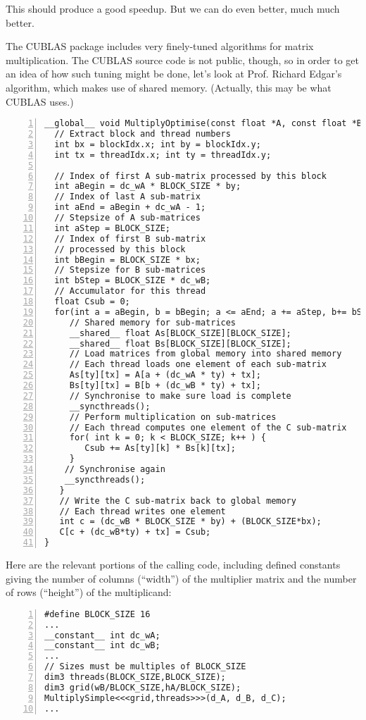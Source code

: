 This should produce a good speedup.  But we can do even better, much
much better.  

The CUBLAS package includes very finely-tuned algorithms for matrix
multiplication.  The CUBLAS source code is not public, though, so in
order to get an idea of how such tuning might be done, let's look at
Prof.  Richard Edgar's algorithm, which makes use of shared memory.
(Actually, this may be what CUBLAS uses.)

\begin{lstlisting}[numbers=left]
__global__ void MultiplyOptimise(const float *A, const float *B, float *C) {
  // Extract block and thread numbers
  int bx = blockIdx.x; int by = blockIdx.y;
  int tx = threadIdx.x; int ty = threadIdx.y;
  
  // Index of first A sub-matrix processed by this block
  int aBegin = dc_wA * BLOCK_SIZE * by;
  // Index of last A sub-matrix
  int aEnd = aBegin + dc_wA - 1;
  // Stepsize of A sub-matrices
  int aStep = BLOCK_SIZE;
  // Index of first B sub-matrix
  // processed by this block
  int bBegin = BLOCK_SIZE * bx;
  // Stepsize for B sub-matrices
  int bStep = BLOCK_SIZE * dc_wB;
  // Accumulator for this thread
  float Csub = 0;
  for(int a = aBegin, b = bBegin; a <= aEnd; a += aStep, b+= bStep) {
     // Shared memory for sub-matrices
     __shared__ float As[BLOCK_SIZE][BLOCK_SIZE];
     __shared__ float Bs[BLOCK_SIZE][BLOCK_SIZE];
     // Load matrices from global memory into shared memory
     // Each thread loads one element of each sub-matrix
     As[ty][tx] = A[a + (dc_wA * ty) + tx];
     Bs[ty][tx] = B[b + (dc_wB * ty) + tx];
     // Synchronise to make sure load is complete
     __syncthreads();
     // Perform multiplication on sub-matrices
     // Each thread computes one element of the C sub-matrix
     for( int k = 0; k < BLOCK_SIZE; k++ ) {
        Csub += As[ty][k] * Bs[k][tx];
     }
    // Synchronise again
    __syncthreads();
   }
   // Write the C sub-matrix back to global memory
   // Each thread writes one element
   int c = (dc_wB * BLOCK_SIZE * by) + (BLOCK_SIZE*bx);
   C[c + (dc_wB*ty) + tx] = Csub;
}
\end{lstlisting}

Here are the relevant portions of the calling code, including defined
constants giving the number of columns (``width'') of the multiplier
matrix and the number of rows (``height'') of the multiplicand:

\begin{lstlisting}[numbers=left]
#define BLOCK_SIZE 16
...
__constant__ int dc_wA;
__constant__ int dc_wB;
...
// Sizes must be multiples of BLOCK_SIZE
dim3 threads(BLOCK_SIZE,BLOCK_SIZE);
dim3 grid(wB/BLOCK_SIZE,hA/BLOCK_SIZE);
MultiplySimple<<<grid,threads>>>(d_A, d_B, d_C);
...
\end{lstlisting}

